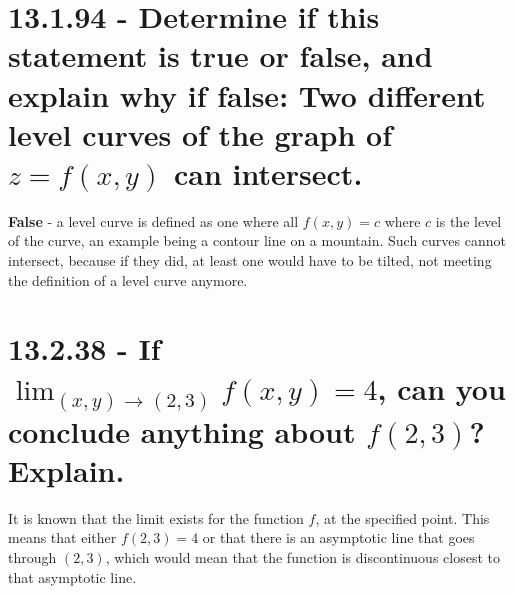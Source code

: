 \documentclass{article}
\begin{document}
\section{13.1.94 - Determine if this statement is true or false, and explain why if false: Two different level curves of the graph of $z = f(x, y)$ can intersect.}

\par\noindent \textbf{False} - a level curve is defined as one where all $f(x, y) = c$ where $c$ is the level of the curve, an example being a contour line on a mountain.  Such curves cannot intersect, because if they did, at least one would have to be tilted, not meeting the definition of a level curve anymore.

\section{13.2.38 - If $\lim_{(x, y)\rightarrow (2, 3)}f(x, y) = 4$, can you conclude anything about $f(2, 3)$?  Explain.}

\par\noindent It is known that the limit exists for the function $f$, at the specified point.  This means that either $f(2, 3) = 4$ or that there is an asymptotic line that goes through $(2, 3)$, which would mean that the function is discontinuous closest to that asymptotic line.
\end{document}
